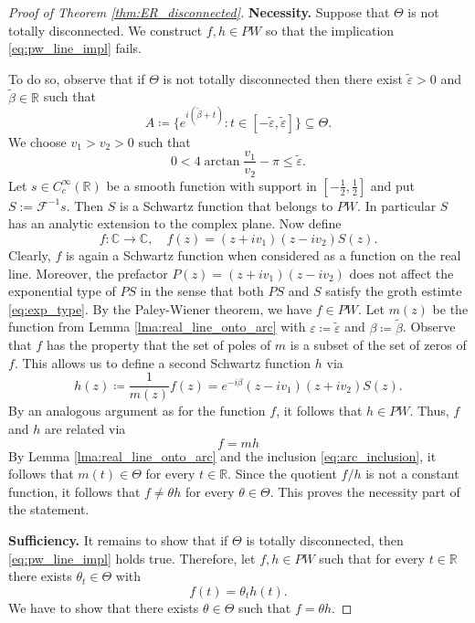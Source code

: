 \documentclass[reqno,a4paper,11pt]{amsart}
\numberwithin{equation}{section}
\def\R{{\mathbb R}}
\def\C{{\mathbb C}}
\newcommand\1{\mathds{1}}
\newcommand{\ift}{{\mathcal{F}^{-1}}}
\begin{document}
\begin{proof}[Proof of Theorem \ref{thm:ER_disconnected}]
\textbf{Necessity.} Suppose that $\Theta$ is not totally disconnected. We construct $f,h \in PW$ so that the implication \eqref{eq:pw_line_impl} fails.

To do so, observe that if $\Theta$ is not totally disconnected then there exist $\tilde \varepsilon>0$ and $\tilde \beta \in \R$ such that
\begin{equation}\label{eq:arc_inclusion}
    A \coloneqq \{ e^{i(\tilde\beta+t)} : t \in [-\tilde\varepsilon,\tilde\varepsilon] \} \subseteq \Theta.
\end{equation}
We choose $v_1>v_2>0$ such that
$$
0 < 4 \arctan \frac{v_1}{v_2} - \pi \leq \tilde\varepsilon.
$$
Let $s \in C_c^\infty(\R)$ be a smooth function with support in $[-\frac{1}{2},\frac{1}{2}]$ and put $S := \ift s$. Then $S$ is a Schwartz function that belongs to $PW$. In particular $S$ has an analytic extension to the complex plane. Now define
$$
f: \C \to \C, \quad f(z) = (z+iv_1)(z-iv_2) S(z).
$$
Clearly, $f$ is again a Schwartz function when considered as a function on the real line. Moreover, the prefactor $P(z) = (z+iv_1)(z-iv_2)$ does not affect the exponential type of $PS$ in the sense that both $PS$ and $S$ satisfy the groth estimte \eqref{eq:exp_type}. By the Paley-Wiener theorem, we have $f \in PW$. Let $m(z)$ be the function from Lemma \ref{lma:real_line_onto_arc} with $\varepsilon \coloneqq \tilde \varepsilon$ and $\beta \coloneqq \tilde \beta$. Observe that $f$ has the property that the set of poles of $m$ is a subset of the set of zeros of $f$. This allows us to define a second Schwartz function $h$ via
$$
h(z) \coloneqq \frac{1}{m(z)} f(z) = e^{-i \beta} (z-i v_1) (z+iv_2) S(z).
$$
By an analogous argument as for the function $f$, it follows that $h \in PW$. Thus, $f$ and $h$ are related via
$$
f=mh
$$
By Lemma \ref{lma:real_line_onto_arc} and the inclusion \eqref{eq:arc_inclusion}, it follows that $m(t) \in \Theta$ for every $t \in \R$. Since the quotient $f/h$ is not a constant function, it follows that $f \neq \theta h$ for every $\theta \in \Theta$. This proves the necessity part of the statement.

\textbf{Sufficiency.} It remains to show that if $\Theta$ is totally disconnected, then \eqref{eq:pw_line_impl} holds true. Therefore, let $f,h \in PW$ such that for every $t\in \R$ there exists $\theta_t\in \Theta$ with
    \begin{equation}\label{eq:assumption_lt_mathcalO}
        f(t) = \theta_t h(t).
    \end{equation}
    We have to show that there exists $\theta \in \Theta$ such that $f=\theta h$.


\end{proof}
\end{document}
